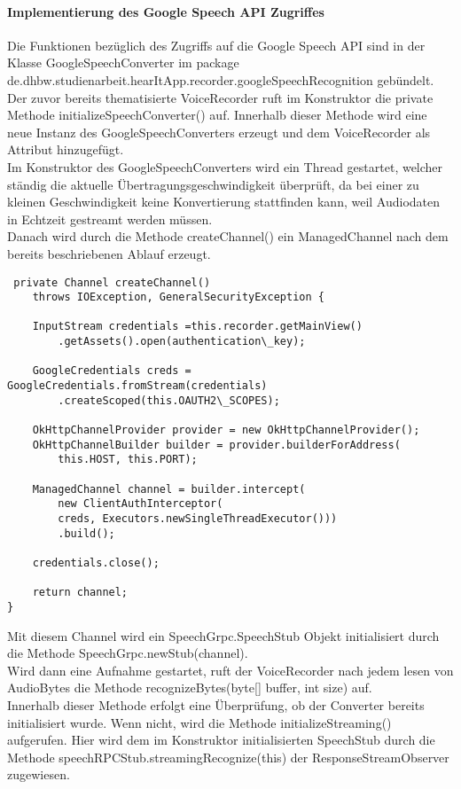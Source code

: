 \paragraph{Implementierung des Google Speech API Zugriffes}
Die Funktionen bezüglich des Zugriffs auf die Google Speech API sind in der Klasse GoogleSpeechConverter im package de.dhbw.studienarbeit.hearItApp.recorder.googleSpeechRecognition gebündelt.
Der zuvor bereits thematisierte VoiceRecorder ruft im Konstruktor die private Methode initializeSpeechConverter() auf. 
Innerhalb dieser Methode wird eine neue Instanz des GoogleSpeechConverters erzeugt und dem VoiceRecorder als Attribut hinzugefügt.\\
Im Konstruktor des GoogleSpeechConverters wird ein Thread gestartet, welcher ständig die aktuelle Übertragungsgeschwindigkeit überprüft, da bei einer zu kleinen Geschwindigkeit keine Konvertierung stattfinden kann, weil Audiodaten in Echtzeit gestreamt werden müssen.\\
Danach wird durch die Methode createChannel() ein ManagedChannel nach dem bereits beschriebenen Ablauf erzeugt.
\begin{lstlisting}
 private Channel createChannel()
 	throws IOException, GeneralSecurityException {
 	
	InputStream credentials =this.recorder.getMainView()
		.getAssets().open(authentication\_key);
		
	GoogleCredentials creds = GoogleCredentials.fromStream(credentials)
		.createScoped(this.OAUTH2\_SCOPES);
		
	OkHttpChannelProvider provider = new OkHttpChannelProvider();
	OkHttpChannelBuilder builder = provider.builderForAddress(
		this.HOST, this.PORT);
	
	ManagedChannel channel = builder.intercept(
		new ClientAuthInterceptor(
		creds, Executors.newSingleThreadExecutor()))
		.build();
	
	credentials.close();
	
	return channel;
}
\end{lstlisting}
Mit diesem Channel wird ein SpeechGrpc.SpeechStub Objekt initialisiert durch die Methode SpeechGrpc.newStub(channel).\\
Wird dann eine Aufnahme gestartet, ruft der VoiceRecorder nach jedem lesen von AudioBytes die Methode recognizeBytes(byte[] buffer, int size) auf.\\
Innerhalb dieser Methode erfolgt eine Überprüfung, ob der Converter bereits initialisiert wurde. Wenn nicht, wird die Methode initializeStreaming() aufgerufen. Hier wird dem im Konstruktor initialisierten SpeechStub durch die Methode speechRPCStub.streamingRecognize(this) der ResponseStreamObserver zugewiesen.\\
